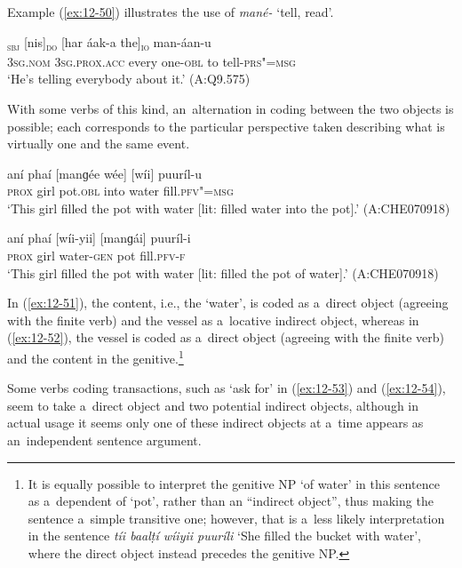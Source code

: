 Example (\ref{ex:12-50}) illustrates the use of \textit{mané-} `tell, read'.

\begin{exe}
\ex
\label{ex:12-50}
\gll [so]\textsubscript{\textsc{sbj}} [nis]\textsubscript{\textsc{do}} [har áak-a the]\textsubscript{\textsc{io}} man-áan-u \\
\textsc{3sg.nom} \textsc{3sg.prox.acc} every one-\textsc{obl} to tell-\textsc{prs"=msg} \\
\glt `He's telling everybody about it.' (A:Q9.575)
\end{exe}

With some verbs of this kind, an~alternation in coding between the two objects is possible; each corresponds to the particular perspective taken describing what is virtually one and the same event. 

\begin{exe}
\ex
\label{ex:12-51}
\gll aní phaí [manɡée wée] [wíi] puuríl-u \\
\textsc{prox} girl pot.\textsc{obl} into water fill.\textsc{pfv"=msg} \\
\glt `This girl filled the pot with water [lit: filled water into the pot].' (A:CHE070918)
\end{exe}
\begin{exe}
\ex
\label{ex:12-52}
\gll aní phaí [wíi-yii] [manɡái] puuríl-i \\
\textsc{prox} girl water-\textsc{gen} pot fill.\textsc{pfv-f} \\
\glt `This girl filled the pot with water [lit: filled the pot of water].' (A:CHE070918)
\end{exe}

In (\ref{ex:12-51}), the content, i.e., the `water', is coded as a~direct object (agreeing with the finite verb) and the vessel as a~locative indirect object, whereas in (\ref{ex:12-52}), the vessel is coded as a~direct object (agreeing with the finite verb) and the content in the genitive.\footnote{It is equally possible to interpret the genitive NP `of water' in this sentence as a~dependent of `pot', rather than an ``indirect object'', thus making the sentence a~simple transitive one; however, that is a~less likely interpretation in the sentence \textit{tíi baalṭí wíiyii puuríli} `She filled the bucket with water', where the direct object instead precedes the genitive NP.} 


Some verbs coding transactions, such as `ask for' in (\ref{ex:12-53}) and (\ref{ex:12-54}), seem to take a~direct object and two potential indirect objects, although in actual usage it seems only one of these indirect objects at a~time appears as an~independent sentence argument. 

